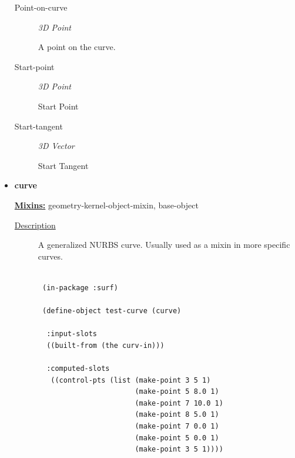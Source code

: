 \documentclass [11pt]{book}
\begin{document}
\begin{itemize}
\begin{description}
\item [Point-on-curve]
\emph{3D Point}

 A point on the curve.




\item [Start-point]
\emph{3D Point}

 Start Point




\item [Start-tangent]
\emph{3D Vector}

 Start Tangent




\end{description}







\item {}
\label{prim:curve}
\textbf{curve}


\textbf{
\underline{Mixins:}} geometry-kernel-object-mixin, base-object





\begin{description}

\item [
\underline{Description}]


A generalized NURBS curve. Usually used as a mixin in more specific curves.



\end{description}




\begin{figure}
\begin{lrbox}{\boxedverb}
\begin{minipage}{\linewidth}
{\small

\begin{verbatim}
 
 (in-package :surf)

 (define-object test-curve (curve)
  
  :input-slots
  ((built-from (the curv-in)))
  
  :computed-slots
   ((control-pts (list (make-point 3 5 1)
                       (make-point 5 8.0 1) 
                       (make-point 7 10.0 1) 
                       (make-point 8 5.0 1) 
                       (make-point 7 0.0 1) 
                       (make-point 5 0.0 1) 
                       (make-point 3 5 1))))
   

\end{verbatim}}
\end{minipage}
\end{lrbox}
\end{figure}
\end{itemize}
\end{document}
